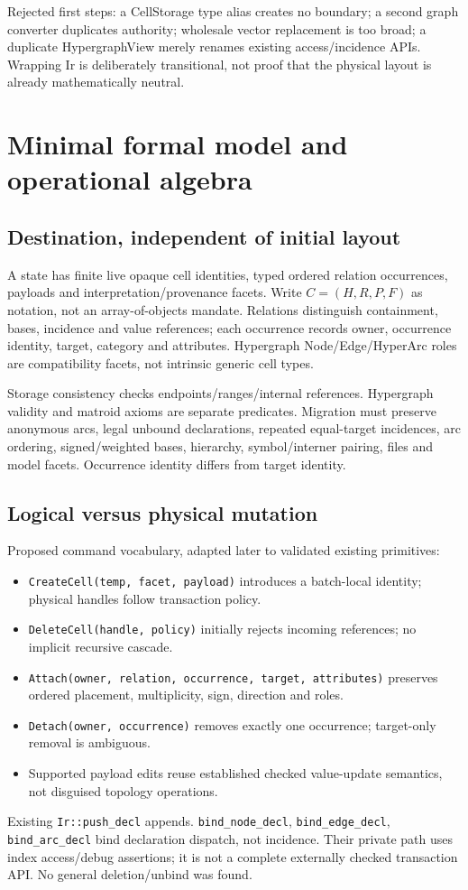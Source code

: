 \documentclass[10pt,a4paper]{article}
\newcommand{\code}[1]{{\small\nolinkurl{#1}}}
\begin{document}
Rejected first steps: a CellStorage type alias creates no boundary; a second graph converter duplicates authority; wholesale vector replacement is too broad; a duplicate HypergraphView merely renames existing access/incidence APIs. Wrapping Ir is deliberately transitional, not proof that the physical layout is already mathematically neutral.

\section{Minimal formal model and operational algebra}
\label{sec:formal}
\subsection{Destination, independent of initial layout}
A state has finite live opaque cell identities, typed ordered relation occurrences, payloads and interpretation/provenance facets. Write $C=(H,R,P,F)$ as notation, not an array-of-objects mandate. Relations distinguish containment, bases, incidence and value references; each occurrence records owner, occurrence identity, target, category and attributes. Hypergraph Node/Edge/HyperArc roles are compatibility facets, not intrinsic generic cell types.

Storage consistency checks endpoints/ranges/internal references. Hypergraph validity and matroid axioms are separate predicates. Migration must preserve anonymous arcs, legal unbound declarations, repeated equal-target incidences, arc ordering, signed/weighted bases, hierarchy, symbol/interner pairing, files and model facets. Occurrence identity differs from target identity.

\subsection{Logical versus physical mutation}
Proposed command vocabulary, adapted later to validated existing primitives:
\begin{itemize}
\item \code{CreateCell(temp, facet, payload)} introduces a batch-local identity; physical handles follow transaction policy.
\item \code{DeleteCell(handle, policy)} initially rejects incoming references; no implicit recursive cascade.
\item \code{Attach(owner, relation, occurrence, target, attributes)} preserves ordered placement, multiplicity, sign, direction and roles.
\item \code{Detach(owner, occurrence)} removes exactly one occurrence; target-only removal is ambiguous.
\item Supported payload edits reuse established checked value-update semantics, not disguised topology operations.
\end{itemize}
Existing \code{Ir::push_decl} appends. \code{bind_node_decl}, \code{bind_edge_decl}, \code{bind_arc_decl} bind declaration dispatch, not incidence. Their private path uses index access/debug assertions; it is not a complete externally checked transaction API. No general deletion/unbind was found.
\end{document}

